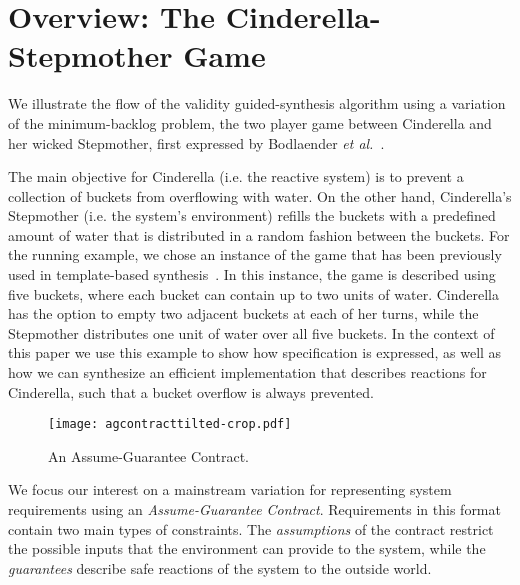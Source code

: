 \section{Overview: The Cinderella-Stepmother Game}
\label{sec:example}

We illustrate the flow of the validity guided-synthesis algorithm using a variation of the minimum-backlog
problem, the two player game between Cinderella and her wicked Stepmother, first expressed by Bodlaender \textit{et al.}~\cite{bodlaender2012cinderella}.

The main objective for Cinderella (i.e. the reactive system) is to prevent a
collection of buckets from overflowing with water. On the other hand,
Cinderella's Stepmother (i.e. the system's environment) refills the buckets with a predefined amount of water that is distributed in a random fashion between the buckets.
For the running example, we chose an instance of the game that has been
previously used in template-based synthesis~\cite{beyene2014constraint}. In this instance, the game is described
using five buckets, where each bucket can contain up to two units of water.
Cinderella has the option to empty two adjacent buckets at each of her turns,
while the Stepmother distributes one unit of water over all five buckets. In the context of this paper we use this example to show how specification is expressed, as well as how we can synthesize an efficient implementation that describes reactions for Cinderella, such that a bucket overflow is always prevented.

\begin{figure}[!t]
\centering
\texttt{[image: agcontracttilted-crop.pdf]}
\caption{An Assume-Guarantee Contract.}
\label{fg:agcontract}
\end{figure}

We focus our interest on a mainstream variation for representing system requirements using an \textit{Assume-Guarantee
Contract}. Requirements in this format contain two main types of constraints.
The \emph{assumptions} of the contract restrict the possible inputs that the
environment can provide to the system, while the \emph{guarantees}
describe safe reactions of the system to the outside world.

